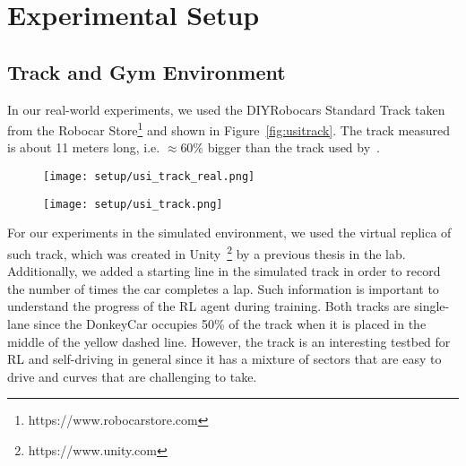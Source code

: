 \chapter{Experimental Setup}


\section{Track and Gym Environment} \label{sec:track}
In our real-world experiments, we used the DIYRobocars Standard Track taken from the Robocar Store\footnote{https://www.robocarstore.com} and shown in Figure~\ref{fig:usitrack}. The track measured is about 11 meters long, i.e. $\approx$60\% bigger than the track used by~\citet{DBLP:journals/corr/abs-2008-00715}. 

\begin{figure}[h]
	\centering
	\begin{minipage}{.5\textwidth}
		\centering
		\texttt{[image: setup/usi\_track\_real.png]}
		\label{fig:usitrack}
	\end{minipage}%
	\begin{minipage}{.5\textwidth}
		\centering
		\texttt{[image: setup/usi\_track.png]}
		\label{fig:usitracksim}
	\end{minipage}
\end{figure}

For our experiments in the simulated environment, we used the virtual replica of such track, which was created in Unity~\footnote{https://www.unity.com} by a previous thesis in the lab. Additionally, we added a starting line in the simulated track in order to record the number of times the car completes a lap. Such information is important to understand the progress of the RL agent during training. Both tracks are single-lane since the DonkeyCar occupies 50\% of the track when it is placed in the middle of the yellow dashed line. However, the track is an interesting testbed for RL and self-driving in general since it has a mixture of sectors that are easy to drive and curves that are challenging to take.

